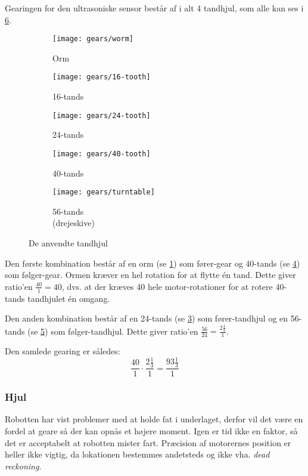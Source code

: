 Gearingen for den ultrasoniske sensor består af i alt 4 tandhjul, som alle kan ses i \cref{gearing:tandhjul}.

\begin{figure}[h] %
\centering
\begin{subfigure}[b]{.19\textwidth}
\centering
\texttt{[image: gears/worm]}
\caption{Orm}
\label{gearing:orm}
\end{subfigure}
\begin{subfigure}[b]{.19\textwidth}
\centering
\texttt{[image: gears/16-tooth]}
\caption{16-tands}
\label{gearing:16tand}
\end{subfigure}
\begin{subfigure}[b]{.19\textwidth}
\centering
\texttt{[image: gears/24-tooth]}
\caption{24-tands}
\label{gearing:24tand}
\end{subfigure}
\begin{subfigure}[b]{.19\textwidth}
\centering
\texttt{[image: gears/40-tooth]}
\caption{40-tands}
\label{gearing:40tand}
\end{subfigure}
\begin{subfigure}[b]{.19\textwidth}
\centering
\texttt{[image: gears/turntable]}
\caption{56-tands \\ \centering (drejeskive)}
\label{gearing:56tand}
\end{subfigure}
\caption{De anvendte tandhjul}
\label{gearing:tandhjul}
\end{figure}

Den første kombination består af en orm (se \cref{gearing:orm}) som fører-gear og 40-tands (se \cref{gearing:40tand}) som følger-gear.
Ormen kræver en hel rotation for at flytte én tand.
Dette giver ratio'en $\frac{40}{1} = 40$, dvs. at der kræves 40 hele motor-rotationer for at rotere 40-tands tandhjulet én omgang.

Den anden kombination består af en 24-tands (se \cref{gearing:24tand}) som fører-tandhjul og en 56-tands (se \cref{gearing:56tand}) som følger-tandhjul.
Dette giver ratio'en $\frac{56}{24} = \frac{2\frac{1}{3}}{1}$.

Den samlede gearing er således: $$\frac{40}{1} \cdot \frac{2\frac{1}{3}}{1} = \frac{93 \frac{1}{3}}{1}$$

\subsubsection{Hjul}
Robotten har vist problemer med at holde fat i underlaget, derfor vil det være en fordel at geare så der kan opnås et højere moment.
Igen er tid ikke en faktor, så det er acceptabelt at robotten mister fart.
Præcision af motorernes position er heller ikke vigtig, da lokationen bestemmes andetsteds og ikke vha. \textit{dead reckoning}.

